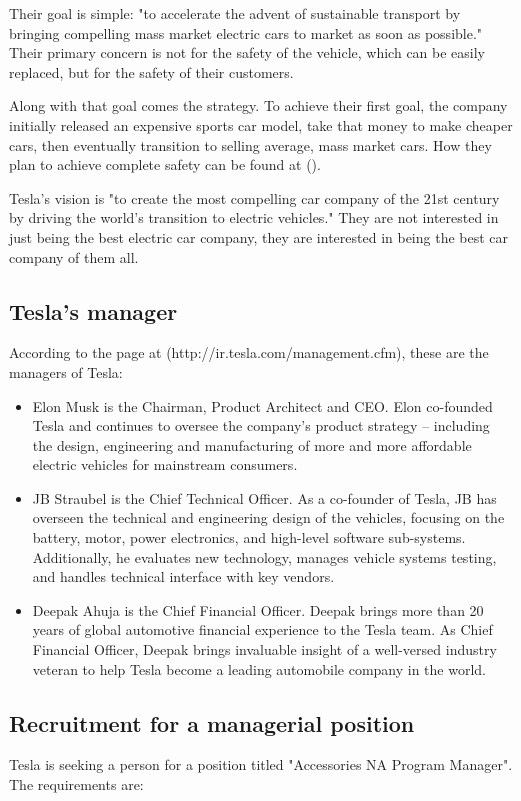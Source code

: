 \documentclass[12pt]{article}
\begin{document}
Their goal is simple: "to accelerate the advent of sustainable transport by bringing compelling mass market electric cars to market as soon as possible." Their primary concern is not for the safety of the vehicle, which can be easily replaced, but for the safety of their customers.

Along with that goal comes the strategy. To achieve their first goal, the company initially released an expensive sports car model, take that money to make cheaper cars, then eventually transition to selling average, mass market cars. How they plan to achieve complete safety can be found at (\cite{mu13}).

Tesla's vision is "to create the most compelling car company of the 21st century by driving the world's transition to electric vehicles." They are not interested in just being the best electric car company, they are interested in being the best car company of them all.

\subsection{Tesla's manager}

According to the page at (http://ir.tesla.com/management.cfm), these are the managers of Tesla:

\begin{itemize}
	\item{Elon Musk is the Chairman, Product Architect and CEO. Elon co-founded Tesla and continues to oversee the company's product strategy -- including the design, engineering and manufacturing of more and more affordable electric vehicles for mainstream consumers.}
	\item{JB Straubel is the Chief Technical Officer. As a co-founder of Tesla, JB has overseen the technical and engineering design of the vehicles, focusing on the battery, motor, power electronics, and high-level software sub-systems. Additionally, he evaluates new technology, manages vehicle systems testing, and handles technical interface with key vendors.}
	\item{Deepak Ahuja is the Chief Financial Officer. Deepak brings more than 20 years of global automotive financial experience to the Tesla team. As Chief Financial Officer, Deepak brings invaluable insight of a well-versed industry veteran to help Tesla become a leading automobile company in the world.}

\end{itemize}

\subsection{Recruitment for a managerial position}
Tesla is seeking a person for a position titled "Accessories NA Program Manager". The requirements are:
\end{document}
